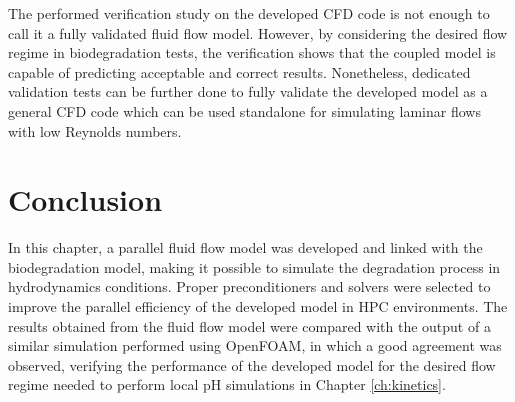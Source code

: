 The performed verification study on the developed CFD code is not enough to call it a fully validated fluid flow model. However, by considering the desired flow regime in biodegradation tests, the verification shows that the coupled model is capable of predicting acceptable and correct results. Nonetheless, dedicated validation tests can be further done to fully validate the developed model as a general CFD code which can be used standalone for simulating laminar flows with low Reynolds numbers.

\section{Conclusion}

In this chapter, a parallel fluid flow model was developed and linked with the biodegradation model, making it possible to simulate the degradation process in hydrodynamics conditions. Proper preconditioners and solvers were selected to improve the parallel efficiency of the developed model in HPC environments. The results obtained from the fluid flow model were compared with the output of a similar simulation performed using OpenFOAM, in which a good agreement was observed, verifying the performance of the developed model for the desired flow regime needed to perform local pH simulations in Chapter \ref{ch:kinetics}.









\cleardoublepage
